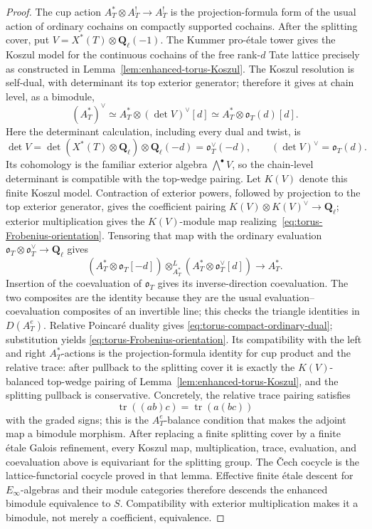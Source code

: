 \documentclass[11pt]{article}
\theoremstyle{definition}
\theoremstyle{remark}
\newcommand{\Qell}{\mathbf Q_\ell}
\begin{document}
\begin{proof}
The cup action
$A_T^*\otimes A_T^!\to A_T^!$ is the projection-formula form of the usual
action of ordinary cochains on compactly supported cochains.  After the
splitting cover, put
$V=X^*(T)\otimes\Qell(-1)$.  The Kummer pro-\'etale tower gives the Koszul
model for the continuous cochains of the free rank-$d$ Tate lattice precisely
as constructed in Lemma~\ref{lem:enhanced-torus-Koszul}.  The
Koszul resolution is self-dual, with determinant its top exterior generator;
therefore it gives at chain level, as a bimodule,
\[
 (A_T^*)^\vee
 \simeq A_T^*\otimes(\det V)^\vee[d]
 \simeq A_T^*\otimes\mathfrak o_T(d)[d].
\]
Here the determinant calculation, including every dual and twist, is
\[
 \det V
 =\det(X^*(T)\otimes\Qell)\otimes\Qell(-d)
 =\mathfrak o_T^\vee(-d),
 \qquad
 (\det V)^\vee=\mathfrak o_T(d).
\]
Its cohomology is the familiar exterior algebra
$\bigwedge^\bullet V$, so the chain-level determinant is compatible with the
top-wedge pairing.
Let $K(V)$ denote this finite Koszul model.  Contraction of exterior powers,
followed by projection to the top exterior generator, gives the coefficient
pairing $K(V)\otimes K(V)^\vee\to\Qell$; exterior multiplication gives the
$K(V)$-module map realizing~\eqref{eq:torus-Frobenius-orientation}.  Tensoring
that map with the ordinary evaluation
$\mathfrak o_T\otimes\mathfrak o_T^\vee\to\Qell$ gives
\[
 (A_T^*\otimes\mathfrak o_T[-d])
 \otimes^L_{A_T^*}(A_T^*\otimes\mathfrak o_T^\vee[d])
 \longrightarrow A_T^*.
\]
Insertion of the coevaluation of $\mathfrak o_T$ gives its inverse-direction
coevaluation.  The two composites are the identity because they are the
usual evaluation--coevaluation composites of an invertible line; this checks
the triangle identities in $D(A_T^e)$.  Relative Poincar\'e duality gives
\eqref{eq:torus-compact-ordinary-dual}; substitution yields
\eqref{eq:torus-Frobenius-orientation}.  Its compatibility with the left and
right $A_T^*$-actions is the projection-formula identity for cup product and
the relative trace: after pullback to the splitting cover it is exactly the
$K(V)$-balanced top-wedge pairing of
Lemma~\ref{lem:enhanced-torus-Koszul}, and the splitting pullback is
conservative.  Concretely, the relative trace pairing satisfies
\[
 \operatorname{tr}((ab)c)=\operatorname{tr}(a(bc))
\]
with the graded signs; this is the $A_T^e$-balance condition that makes the
adjoint map a bimodule morphism.  After replacing a finite splitting
cover by a finite \'etale Galois refinement, every Koszul map, multiplication,
trace, evaluation, and coevaluation above is equivariant for the splitting
group.  The \v{C}ech cocycle is the lattice-functorial cocycle proved in that
lemma.  Effective finite \'etale descent for $E_\infty$-algebras and their
module categories therefore descends the enhanced bimodule equivalence to
$S$.  Compatibility
with exterior multiplication makes it a bimodule, not merely a coefficient,
equivalence.
\end{proof}
\end{document}
